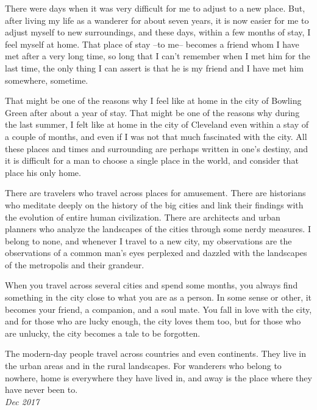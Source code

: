 \documentclass[oneside,12pt]{book}
\begin{document}
There were days when it was very difficult for me to adjust to a new place. But, after living my life as a wanderer for about seven years, it is now easier for me to adjust myself to new surroundings, and these days, within a few months of stay, I feel myself at home. That place of stay --to me-- becomes a friend whom I have met after a very long time, so long that I can't remember when I met him for the last time, the only thing I can assert is that he is my friend and I have met him somewhere, sometime. 

That might be one of the reasons why I feel like at home in the city of Bowling Green after about a year of stay. That might be one of the reasons why during the last summer, I felt like at home in the city of Cleveland even within a stay of a couple of months, and even if I was not that much fascinated with the city. All these places and times and surrounding are perhaps written in one’s destiny, and it is difficult for a man to choose a single place in the world, and consider that place his only home.

There are travelers who travel across places for amusement. There are historians who meditate deeply on the history of the big cities and link their findings with the evolution of entire human civilization. There are architects and urban planners who analyze the landscapes of the cities through some nerdy measures. I belong to none, and  whenever I travel to a new city, my observations are the observations of a common man’s eyes perplexed and dazzled with the landscapes of the metropolis and their grandeur.

When you travel across several cities and spend some months, you always find something in the city close to what you are as a person. In some sense or other, it becomes your friend, a companion, and a soul mate. You fall in love with the city, and for those who are lucky enough, the city loves them too, but for those who are unlucky, the city becomes a tale to be forgotten.

The modern-day people travel across countries and even continents. They live in the urban areas and in the rural landscapes. For wanderers who belong to nowhere, home is everywhere they have lived in, and away is the place where they have never been to. \\

\textit{Dec 2017}
\end{document}
